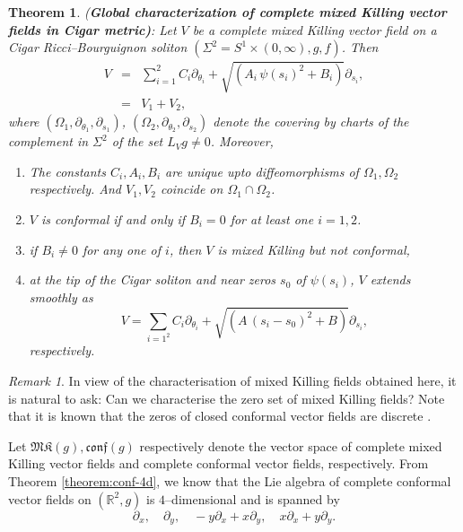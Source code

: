 \documentclass{article}
\newtheorem{theorem}{Theorem}[section]
\theoremstyle{definition}
\theoremstyle{remark}
\newtheorem{remark}{Remark}[section]
\begin{document}
\begin{theorem}\label{mkc-g} {(\bf Global  characterization of complete mixed Killing vector fields in Cigar metric)}:
Let $V$ be a complete mixed Killing vector field on a Cigar Ricci--Bourguignon soliton $(\Sigma^2 = S^1 \times (0, \infty), g, f) $. 
Then 
\begin{eqnarray}
V & = & \sum_{i=1}^{2} C_i   \partial_{{\theta}_i}  +   \sqrt{(A_i\,\psi(s_{i})^2 + B_i)}  \partial_{s_i}, \\ \nonumber
& = &  V_1 + V_2,
\end{eqnarray}
where $\left(\Omega_1, \partial_{{\theta}_1},  \partial_{s_1} \right)$, $\left(\Omega_2,  \partial_{{\theta}_2}, \partial_{s_2}\right)$ denote the covering by charts of the complement in $\Sigma^2$ of the set $L_{V}g \neq 0$. 
Moreover, 
\begin{enumerate}
\item The constants $C_i, A_i, B_i$ are unique upto diffeomorphisms
of $\Omega_1, \Omega_2$ respectively. And $V_1, V_2$ coincide on
$\Omega_1 \cap \Omega_2$. 
\item $V$ is conformal if and only if $B_i=0$ for at least one 
$i =1,2$.
\item if $B_i\neq 0$ for any one of $i$, then $V$ is mixed Killing but not conformal,
\item   at the tip of the Cigar soliton and near zeros $s_{0}$ of  ${\psi}(s_i)$,  $V$ 
extends smoothly as  
$$ V =\sum_{{i=1}^{2}} C_{i} \partial_{{\theta}_{i}}   +   \sqrt{(A\, (s_{i}-s_{0})^2 + B)}  \partial_{s_{i}}, $$
respectively.
\end{enumerate}
\end{theorem}


\vspace{0.1in}


\begin{remark}
In view of the characterisation of mixed Killing fields obtained here,
it is natural to ask: Can we characterise the zero set 
of mixed Killing fields?  Note that it is known that the zeros 
of closed conformal vector fields are discrete \cite{MR4648543}.
\end{remark}

\vspace{0.2in}

Let $\mathfrak{MK}(g), \mathfrak{conf}(g)$ respectively
denote the vector space of complete mixed Killing vector fields
and complete conformal vector fields, respectively. From Theorem
\ref{theorem:conf-4d}, we know that
the Lie algebra of complete conformal vector fields on $(\mathbb{R}^2,g)$ is $4$--dimensional and is spanned by
\[
\partial_x,\quad \partial_y,\quad -y\partial_x + x\partial_y,\quad x\partial_x + y\partial_y.
\]
\end{document}
